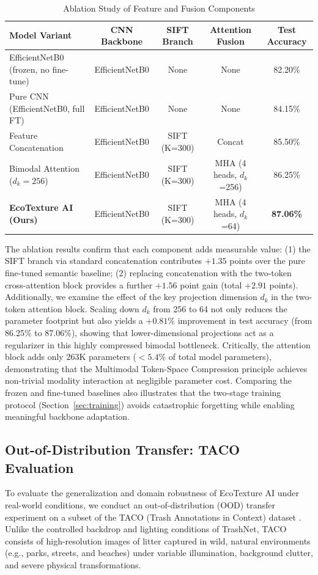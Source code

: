 \documentclass[12pt, a4paper]{article}
\begin{document}
\begin{table}[H]
\centering
\caption{Ablation Study of Feature and Fusion Components}
\label{tab:ablation}
\begin{tabular}{lcccc}
\toprule
\textbf{Model Variant} & \textbf{CNN Backbone} & \textbf{SIFT Branch} & \textbf{Attention Fusion} & \textbf{Test Accuracy} \\
\midrule
EfficientNetB0 (frozen, no fine-tune) & EfficientNetB0 & None & None & 82.20\% \\
Pure CNN (EfficientNetB0, full FT) & EfficientNetB0 & None & None & 84.15\% \\
Feature Concatenation & EfficientNetB0 & SIFT (K=300) & Concat & 85.50\% \\
Bimodal Attention ($d_k=256$) & EfficientNetB0 & SIFT (K=300) & MHA (4 heads, $d_k$=256) & 86.25\% \\
\textbf{EcoTexture AI (Ours)} & EfficientNetB0 & SIFT (K=300) & MHA (4 heads, $d_k$=64) & \textbf{87.06\%} \\
\bottomrule
\end{tabular}
\end{table}

The ablation results confirm that each component adds measurable value: (1) the SIFT branch via standard concatenation contributes $+1.35$ points over the pure fine-tuned semantic baseline; (2) replacing concatenation with the two-token cross-attention block provides a further $+1.56$ point gain (total $+2.91$ points). Additionally, we examine the effect of the key projection dimension $d_k$ in the two-token attention block. Scaling down $d_k$ from 256 to 64 not only reduces the parameter footprint but also yields a $+0.81\%$ improvement in test accuracy (from 86.25\% to 87.06\%), showing that lower-dimensional projections act as a regularizer in this highly compressed bimodal bottleneck. Critically, the attention block adds only 263K parameters ($<5.4\%$ of total model parameters), demonstrating that the Multimodal Token-Space Compression principle achieves non-trivial modality interaction at negligible parameter cost. Comparing the frozen and fine-tuned baselines also illustrates that the two-stage training protocol (Section~\ref{sec:training}) avoids catastrophic forgetting while enabling meaningful backbone adaptation.

\subsection{Out-of-Distribution Transfer: TACO Evaluation}
To evaluate the generalization and domain robustness of EcoTexture AI under real-world conditions, we conduct an out-of-distribution (OOD) transfer experiment on a subset of the TACO (Trash Annotations in Context) dataset \citep{taco}. Unlike the controlled backdrop and lighting conditions of TrashNet, TACO consists of high-resolution images of litter captured in wild, natural environments (e.g., parks, streets, and beaches) under variable illumination, background clutter, and severe physical transformations.
\end{document}
